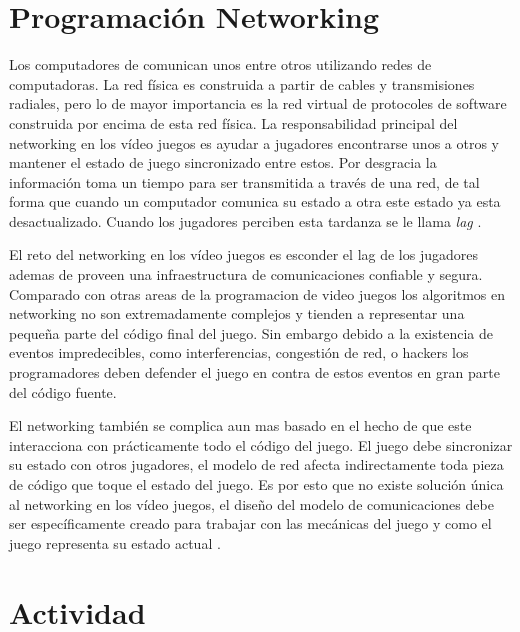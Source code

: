 \section{Programación Networking}
Los computadores de comunican unos entre otros utilizando redes de computadoras. La red física es construida a partir de cables y transmisiones radiales, pero lo de mayor importancia es la red virtual de protocoles de software construida por encima de esta red física. La responsabilidad principal del networking en los vídeo juegos es ayudar a jugadores encontrarse unos a otros y mantener el estado de juego sincronizado entre estos. Por desgracia la información toma un tiempo para ser transmitida a través de una red, de tal forma que cuando un computador comunica su estado a otra este estado ya esta desactualizado. Cuando los jugadores perciben esta tardanza se le llama \emph{lag} \cite[p.~356]{jenkinscreatinggames}.

El reto del networking en los vídeo juegos es esconder el lag de los jugadores ademas de proveen una infraestructura de comunicaciones confiable y segura. Comparado con otras areas de la programacion de video juegos los algoritmos en networking no son extremadamente complejos y tienden a representar una pequeña parte del código final del juego. Sin embargo debido a la existencia de eventos impredecibles, como interferencias, congestión de red, o hackers los programadores deben defender el juego en contra de estos eventos en gran parte del código fuente.

El networking también se complica aun mas basado en el hecho de que este interacciona con prácticamente todo el código del juego. El juego debe sincronizar su estado con otros jugadores, el modelo de red afecta indirectamente toda pieza de código que toque el estado del juego. Es por esto que no existe solución única al networking en los vídeo juegos, el diseño del modelo de comunicaciones debe ser específicamente creado para trabajar con las mecánicas del juego y como el juego representa su estado actual \cite{netaoe}.
\section{Actividad}
